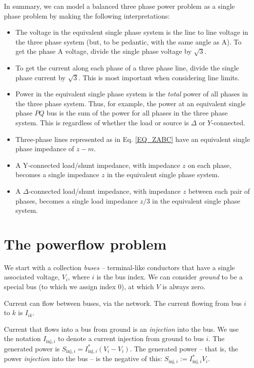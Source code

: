 \documentclass[10pt]{article}
\begin{document}
In summary, we can model a balanced three phase power problem as a single phase problem by making the following interpretations:
\begin{itemize}
	\item The voltage in the equivalent single phase system is the line to line voltage in the three phase system (but, to be pedantic, with the same angle as A). To get the phase A voltage, divide the single phase voltage by $\sqrt{3}$.
	\item To get the current along each phase of a three phase line, divide the single phase current by $\sqrt{3}$. This is most important when considering line limits.
	\item Power in the equivalent single phase system is the \emph{total} power of all phases in the three phase system. Thus, for example, the power at an equivalent single phase $PQ$ bus is the sum of the power for all phases in the three phase system. This is regardless of whether the load or source is $\Delta$ or $Y$-connected.
	\item Three-phase lines represented as in Eq. \ref{EQ_ZABC} have an equivalent single phase impedance of $z - m$.
	\item A Y-connected load/shunt impedance, with impedance $z$ on each phase, becomes a single impedance $z$ in the equivalent single phase system.
	\item A $\Delta$-connected load/shunt impedance, with impedance $z$ between each pair of phases, becomes a single load impedance $z/3$ in the equivalent single phase system.
	
\end{itemize}

\section{The powerflow problem}

We start with a collection \emph{buses} -- terminal-like conductors that have a single associated voltage, $V_i$, where $i$ is the bus index. We can consider \emph{ground} to be a special bus (to which we assign index 0), at which $V$ is always zero.

Current can flow between buses, via the network. The current flowing from bus $i$ to $k$ is $I_{ik}$. 

Current that flows into a bus from ground is an \emph{injection} into the bus. We use the notation $I_{\text{inj},i}$ to denote a current injection from ground to bus $i$. The generated power is $S_{\text{inj}, i} = I_{\text{inj}, i}^*(V_i - V_i)$. The generated power -- that is, the power \emph{injection} into the bus -- is the negative of this: $S_{\text{inj},i} := I_{\text{inj},i}^*V_i$.
\end{document}
